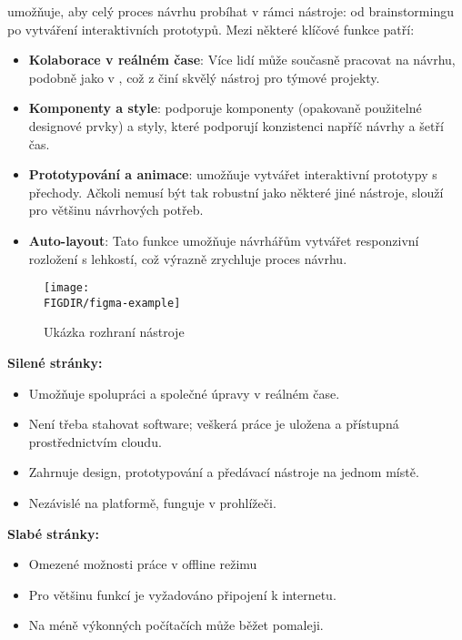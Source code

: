  umožňuje, aby celý proces návrhu probíhat v rámci nástroje: od brainstormingu po vytváření interaktivních prototypů.
Mezi některé klíčové funkce patří:
\begin{itemize}
    \item \textbf{Kolaborace v reálném čase}: Více lidí může současně pracovat na návrhu, podobně jako v , což z  činí skvělý nástroj pro týmové projekty.
    \item \textbf{Komponenty a style}:  podporuje komponenty (opakovaně použitelné designové prvky) a styly, které podporují konzistenci napříč návrhy a šetří čas.
    \item \textbf{Prototypování a animace}:  umožňuje vytvářet interaktivní prototypy s přechody.
    Ačkoli nemusí být tak robustní jako některé jiné nástroje, slouží pro většinu návrhových potřeb.
    \item \textbf{Auto-layout}: Tato funkce umožňuje návrhářům vytvářet responzivní rozložení s lehkostí, což výrazně zrychluje proces návrhu.
\end{itemize}

\begin{figure}[H]
    \centering
    \texttt{[image: \\FIGDIR/figma-example]}
    \caption{Ukázka rozhraní nástroje \cite{figma}}
    \label{fig:figma-example}
\end{figure}

\textbf{Silené stránky:}
\begin{itemize}
    \item Umožňuje spolupráci a společné úpravy v reálném čase.
    \item Není třeba stahovat software; veškerá práce je uložena a přístupná prostřednictvím cloudu.
    \item Zahrnuje design, prototypování a předávací nástroje na jednom místě.
    \item Nezávislé na platformě, funguje v prohlížeči.
\end{itemize}

\textbf{Slabé stránky:}
\begin{itemize}
    \item Omezené možnosti práce v offline režimu
    \item Pro většinu funkcí je vyžadováno připojení k internetu.
    \item Na méně výkonných počítačích může běžet pomaleji.
\end{itemize}

